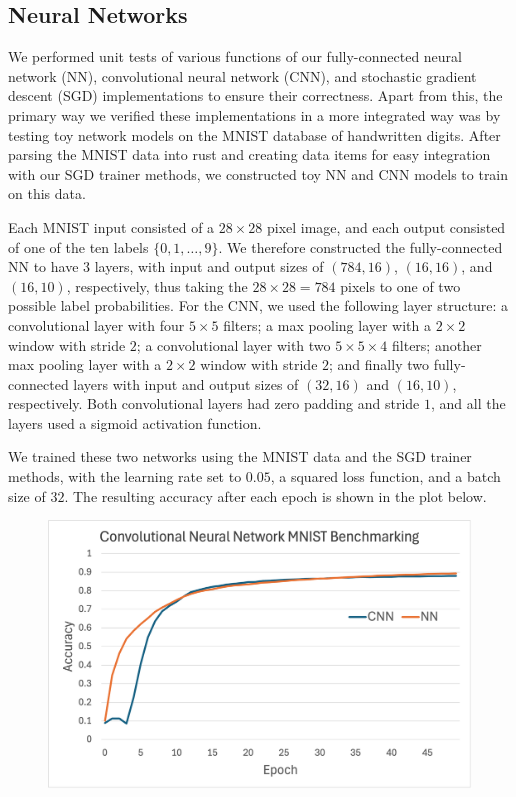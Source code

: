 \subsection{Neural Networks}

We performed unit tests of various functions of our fully-connected neural network (NN), convolutional neural network (CNN), and stochastic gradient descent (SGD) implementations to ensure their correctness.
Apart from this, the primary way we verified these implementations in a more integrated way was by testing toy network models on the MNIST database of handwritten digits\textcolor{blue}{\autocite{MNIST_Dataset}}.
After parsing the MNIST data into rust and creating data items for easy integration with our SGD trainer methods, we constructed toy NN and CNN models to train on this data.

Each MNIST input consisted of a $28 \times 28$ pixel image, and each output consisted of one of the ten labels $\{0, 1, \dots, 9\}$.
We therefore constructed the fully-connected NN to have 3 layers, with input and output sizes of $(784, 16)$, $(16, 16)$, and $(16, 10)$, respectively, thus taking the $28 \times 28 = 784$ pixels to one of two possible label probabilities.
For the CNN, we used the following layer structure: a convolutional layer with four $5 \times 5$ filters; a max pooling layer with a $2 \times 2$ window with stride $2$; a convolutional layer with two $5 \times 5 \times 4$ filters; another max pooling layer with a $2 \times 2$ window with stride $2$; and finally two fully-connected layers with input and output sizes of $(32, 16)$ and $(16, 10)$, respectively. Both convolutional layers had zero padding and stride $1$, and all the layers used a sigmoid activation function.

We trained these two networks using the MNIST data and the SGD trainer methods, with the learning rate set to $0.05$, a squared loss function, and a batch size of $32$.
The resulting accuracy after each epoch is shown in the plot below.

\begin{figure}[H]
  \includegraphics[width=\textwidth]{images/CNNBenchmarking.png}
\end{figure}

